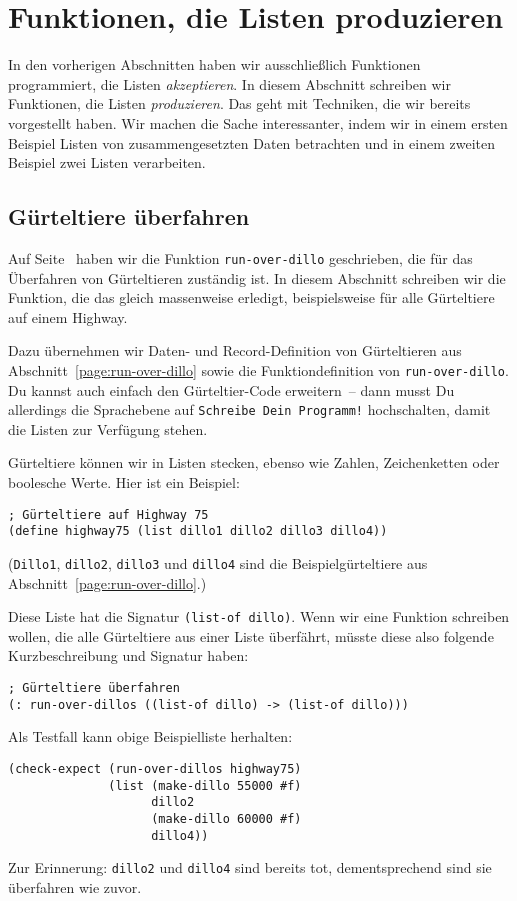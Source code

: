 \section{Funktionen, die Listen produzieren}

In den vorherigen Abschnitten haben wir ausschließlich Funktionen
programmiert, die Listen \emph{akzeptieren}.  In diesem Abschnitt
schreiben wir Funktionen, die Listen \emph{produzieren}.  Das geht mit
Techniken, die wir bereits vorgestellt haben.  Wir machen die Sache
interessanter, indem wir in einem ersten Beispiel Listen von
zusammengesetzten Daten betrachten und in einem zweiten Beispiel zwei
Listen verarbeiten.

\subsection{Gürteltiere überfahren}

Auf Seite~\pageref{page:run-over-dillo} haben wir die Funktion
\texttt{run-over-dillo} geschrieben, die für das Überfahren von
Gürteltieren zuständig ist.  In diesem Abschnitt schreiben wir die
Funktion, die das gleich massenweise erledigt, beispielsweise für alle
Gürteltiere auf einem Highway.

Dazu übernehmen wir Daten- und Record-Definition von Gürteltieren aus
Abschnitt~\ref{page:run-over-dillo} sowie die Funktiondefinition von
\lstinline{run-over-dillo}.  Du kannst auch einfach den Gürteltier-Code
erweitern~-- dann musst Du allerdings die Sprachebene auf
\texttt{Schreibe Dein Programm!} hochschalten, damit die Listen zur
Verfügung stehen.

Gürteltiere können wir in Listen stecken, ebenso wie Zahlen,
Zeichenketten oder boolesche Werte.  Hier ist ein Beispiel:
%
\begin{lstlisting}
; Gürteltiere auf Highway 75
(define highway75 (list dillo1 dillo2 dillo3 dillo4))
\end{lstlisting}
(\lstinline{Dillo1}, \lstinline{dillo2}, \lstinline{dillo3} und \lstinline{dillo4} sind die
Beispielgürteltiere aus Abschnitt~\ref{page:run-over-dillo}.)

Diese Liste hat die Signatur \lstinline{(list-of dillo)}.  Wenn wir eine
Funktion schreiben wollen, die alle Gürteltiere aus einer Liste
überfährt, müsste diese also folgende Kurzbeschreibung und Signatur
haben:
%
\begin{lstlisting}
; Gürteltiere überfahren
(: run-over-dillos ((list-of dillo) -> (list-of dillo)))
\end{lstlisting}
%
Als Testfall kann obige Beispielliste herhalten:
%
\begin{lstlisting}
(check-expect (run-over-dillos highway75)
              (list (make-dillo 55000 #f)
                    dillo2
                    (make-dillo 60000 #f)
                    dillo4))
\end{lstlisting}
%
Zur Erinnerung: \lstinline{dillo2} und \lstinline{dillo4} sind bereits tot,
dementsprechend sind sie überfahren wie zuvor.

